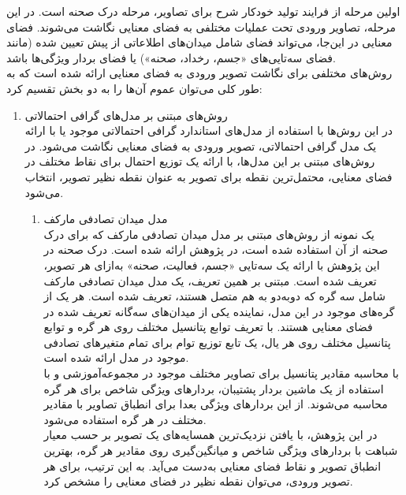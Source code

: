 اولین مرحله از فرایند تولید خودکار شرح برای تصاویر، مرحله درک صحنه است. در این مرحله، تصاویر ورودی تحت عملیات مختلفی به فضای معنایی نگاشت می‌شوند. فضای معنایی در این‌جا، می‌تواند فضای شامل میدان‌های اطلاعاتی از پیش تعیین شده (مانند فضای سه‌تایی‌های «جسم، رخداد، صحنه») یا فضای بردار ویژگی‌ها باشد.
\\
روش‌های مختلفی برای نگاشت تصویر ورودی به فضای معنایی ارائه شده است که به طور کلی می‌توان عموم آن‌ها را به دو بخش تقسیم کرد:
\begin{enumerate}
\item
روش‌های مبتنی بر مدل‌های گرافی احتمالاتی\\
در این روش‌ها با استفاده از مدل‌های استاندارد گرافی احتمالاتی موجود یا با ارائه یک مدل گرافی احتمالاتی، تصویر ورودی به فضای معنایی نگاشت می‌شود. در روش‌های مبتنی بر این مدل‌ها، با ارائه یک توزیع احتمال برای نقاط مختلف در فضای معنایی، محتمل‌ترین نقطه برای تصویر به عنوان نقطه نظیر تصویر، انتخاب می‌شود.
	\begin{enumerate}
		\item مدل میدان تصادفی مارکف\\

یک نمونه از روش‌های مبتنی بر مدل میدان تصادفی مارکف که برای درک صحنه از آن استفاده شده است، در پژوهش\cite{Farhadi2010every} 
ارائه شده است. درک صحنه در این پژوهش با ارائه یک سه‌تایی «جسم، فعالیت، صحنه» به‌ازای هر تصویر، تعریف شده است. مبتنی بر همین تعریف، یک مدل میدان تصادفی مارکف شامل سه گره که دو‌به‌دو به هم متصل هستند، تعریف شده است. هر یک از گره‌های موجود در این مدل، نماینده یکی از میدان‌های سه‌گانه تعریف شده در فضای معنایی هستند. با تعریف توابع پتانسیل مختلف روی هر گره و توابع پتانسیل مختلف روی هر یال، یک تابع توزیع توام برای تمام متغیرهای تصادفی موجود در مدل ارائه شده است.
\\
با محاسبه مقادیر پتانسیل برای تصاویر مختلف موجود در مجموعه‌آموزشی و با استفاده از یک ماشین بردار پشتیبان، بردارهای ویژگی شاخص برای هر گره محاسبه می‌شوند. از این بردارهای ویژگی بعدا برای انطباق تصاویر با مقادیر مختلف در هر گره استفاده می‌شود.
\\
در این پژوهش،‌ با یافتن نزدیک‌ترین همسایه‌های یک تصویر بر حسب معیار شباهت با بردارهای ویژگی شاخص  و میانگین‌گیری روی مقادیر هر گره، بهترین انطباق تصویر و نقاط فضای معنایی به‌دست می‌آید. به این ترتیب، برای هر تصویر ورودی، می‌توان نقطه نظیر در فضای معنایی را مشخص کرد.
		

\end{enumerate}
\end{enumerate}
